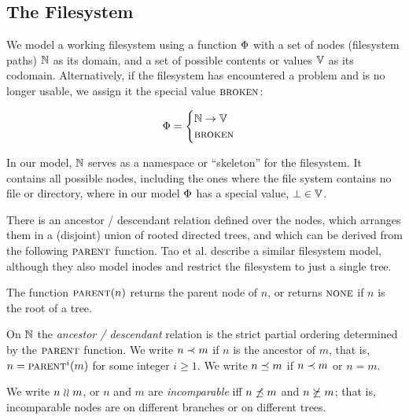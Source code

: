 
\subsection{The Filesystem}

We model a working filesystem
using a function $\Phi$ with a set of nodes (filesystem paths) $\mathbb{N}$ as its domain,
and a set of possible contents or values $\mathbb{V}$ as its codomain.
Alternatively, if the filesystem has encountered a problem and is no longer usable, 
we assign it the special value $\text{\normalfont\scshape{broken}}$:
\begin{mydef}[Filesystem]
\begin{gather*}
\Phi =
\begin{cases}
\mathbb{N} \rightarrow \mathbb{V} \\
\text{\normalfont\scshape{broken}}
\end{cases}
\end{gather*}
\end{mydef}
In our model, $\mathbb{N}$ 
serves as a namespace or ``skeleton'' for the filesystem.
It contains all possible nodes, including the ones 
where the file system contains no file or directory,
where in our model $\Phi$ has a special value, $\bot\in\mathbb{V}$.

There is an ancestor / descendant relation defined over the nodes,
which arranges them in a (disjoint) union of rooted directed trees,
and which can be derived from the following $\parent$ function.
Tao et al. \cite{TSR} describe a similar filesystem model, although
they also model inodes and restrict the filesystem to just a single tree.
\begin{mydef}[$\parent$]
The function $\text{\normalfont\scshape{parent}}(n)$ returns the parent node of $n$, or
returns $\text{\normalfont\scshape{none}}$ if $n$ is the root of a tree.
\end{mydef}

\begin{mydef}[$n\descendant m$]
On $\mathbb{N}$ the \emph{ancestor / descendant} relation is the
strict partial ordering determined by the $\parent$ function.
We write $n\descendant m$ if $n$ is the ancestor of $m$,
that is, $n=\text{\normalfont\scshape{parent}}^i(m)$ for some integer $i\ge 1$.
We write $n\preceq m$ if $n\descendant m$ or $n=m$.
\end{mydef}

\begin{mydef}[$n\unrel m$]
We write $n\unrel m$, or $n$ and $m$ are \emph{incomparable}
iff $n\not\preceq m$ and $n\not\succeq m$;
that is, incomparable nodes are on different branches or on different trees.
\end{mydef}

